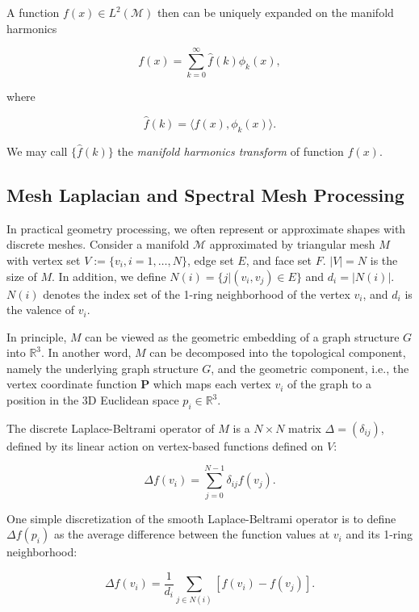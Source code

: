 A function $f(x)\in L^2(\mathcal{M})$ then can be uniquely expanded on the manifold harmonics

\begin{equation}\label{eq:ift}
f(x)=\sum_{k=0}^\infty\hat{f}(k)\phi_k(x),
\end{equation}

where

\begin{equation}
\hat{f}(k)=\langle f(x),\phi_k(x)\rangle.
\end{equation}

We may call $\{\hat{f}(k)\}$ the \emph{manifold harmonics transform} of function $f(x)$.

\subsection{Mesh Laplacian and Spectral Mesh Processing}
In practical geometry processing, we often represent or approximate shapes with discrete meshes.
Consider a manifold $\mathcal{M}$ approximated by triangular mesh $M$ with vertex
set $V:=\{v_i, i=1,\ldots,N\}$, edge set $E$, and face set $F$. $|V|=N$ is the size
of $M$. In addition, we define $N(i)=\{j|(v_i,v_j)\in E\}$ and $d_i=|N(i)|$. $N(i)$
denotes the index set of the 1-ring neighborhood of the vertex $v_i$, and $d_i$ is
the valence of $v_i$.

In principle, $M$ can be viewed as the geometric embedding of a graph structure
$G$ into $\mathbb{R}^3$. In another word, $M$ can be decomposed into the
topological component, namely the underlying graph structure $G$, and the geometric
component, i.e., the vertex coordinate function $\mathbf{P}$ which maps each vertex
$v_i$ of the graph to a position in the 3D Euclidean space $p_i\in\mathbb{R}^3$.

The discrete Laplace-Beltrami operator of $M$ is a $N\times N$ matrix
$\Delta=(\delta_{ij})$, defined by its linear action
on vertex-based functions defined on $V$:

\begin{equation}
\Delta f(v_i)=\sum_{j=0}^{N-1}\delta_{ij}f(v_j).
\end{equation}

One simple discretization of the smooth Laplace-Beltrami operator is to
define $\Delta f(p_i)$ as the average difference between the function
values at $v_i$ and its 1-ring neighborhood:

\begin{equation}
\Delta f(v_i)=\frac{1}{d_i}\sum_{j\in N(i)} [f(v_i)-f(v_j)].
\end{equation}


